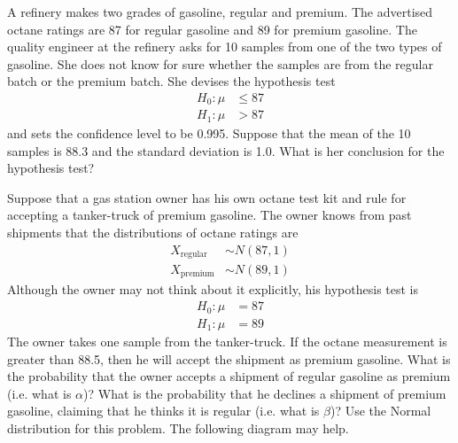 A refinery makes two grades of gasoline, regular and premium.  The
advertised octane ratings are 87 for regular gasoline and 89 for
premium gasoline.  The quality engineer at the refinery asks for 10
samples from one of the two types of gasoline. She does not know for
sure whether the samples are from the regular batch or the premium
batch. She devises the hypothesis test
\begin{align*}
H_0: \mu &\leq 87 \\
H_1: \mu &> 87
\end{align*}
and sets the confidence level to be 0.995. Suppose that the mean of
the 10 samples is 88.3 and the standard deviation is 1.0. What is her
conclusion for the hypothesis test?

Suppose that a gas station owner has his own octane test
kit and rule for accepting a tanker-truck of premium gasoline.
The owner knows from past shipments that the distributions
of octane ratings are
\begin{align*}
X_{\text{regular}} &\sim N(87,1) \\
X_{\text{premium}} &\sim N(89,1)
\end{align*}
Although the owner may not think about it explicitly, his hypothesis
test is
\begin{align*}
H_0: \mu &= 87 \\
H_1: \mu &= 89
\end{align*}
The owner takes one sample from the tanker-truck. If the octane
measurement is greater than 88.5, then he will accept the shipment as
premium gasoline. What is the probability that the owner accepts a
shipment of regular gasoline as premium (i.e. what is $\alpha$)? What
is the probability that he declines a shipment of premium gasoline,
claiming that he thinks it is regular (i.e. what is $\beta$)?  Use the
Normal distribution for this problem. The following diagram may help.


